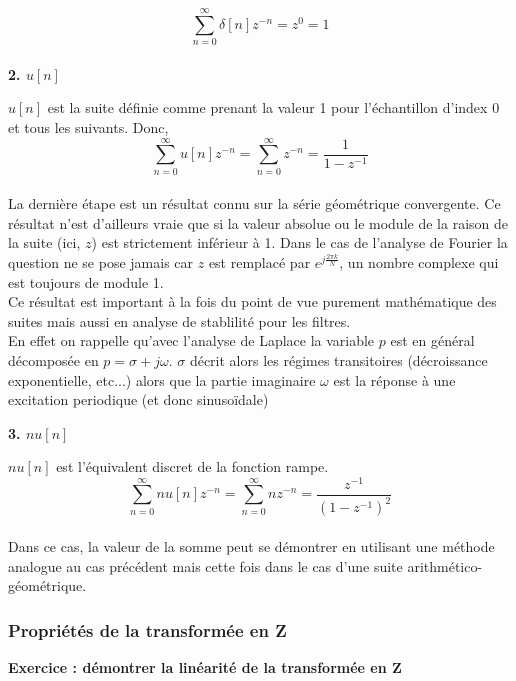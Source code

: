 \documentclass[11pt,a4paper]{article}
\begin{document}
\[\sum_{n = 0}^{\infty} \delta[n] z^{-n} = z^0 = 1 \]\\

\textbf{2. $u[n]$}

$u[n]$ est la suite définie comme prenant la valeur 1 pour l'échantillon d'index 0 et tous les suivants. Donc,\\

\[\sum_{n = 0}^{\infty} u[n] z^{-n} = \sum_{n = 0}^{\infty} z^{-n}  = \frac{1}{1-z^{-1}} \]\\

La dernière étape est un résultat connu sur la série géométrique convergente. Ce résultat n'est d'ailleurs vraie que si la valeur absolue ou le module de la raison de la suite (ici, $z$) est strictement inférieur à 1.  Dans le cas de l'analyse de Fourier la question ne se pose jamais car $z$ est remplacé par $e^{j\frac{2 \pi k }{N}}$, un nombre complexe qui est toujours de  module 1.\\

Ce résultat est important à la fois du point de vue purement mathématique des suites mais aussi en analyse de stablilité pour les filtres.\\

En effet on rappelle qu'avec l'analyse de  Laplace la variable $p$ est en général décomposée en $p = \sigma + j \omega$.  $\sigma$ décrit alors les régimes transitoires (décroissance exponentielle, etc...) alors que la partie imaginaire $\omega$ est la réponse à une excitation periodique (et donc sinusoïdale)

\textbf{3. $nu[n]$}

 $nu[n]$ est l'équivalent discret de la fonction rampe.\\
 

\[\sum_{n = 0}^{\infty} n u[n] z^{-n} = \sum_{n = 0}^{\infty} n z^{-n}  = \frac{z^{-1}}{(1-z^{-1})^2} \]\\ 

Dans ce cas, la valeur de la somme peut se démontrer en utilisant une méthode analogue au cas précédent mais cette fois dans le cas d'une suite arithmético-géométrique.



\subsubsection{Propriétés de la transformée en Z}

\textbf{Exercice : démontrer la linéarité de la transformée en Z}\\
\end{document}
